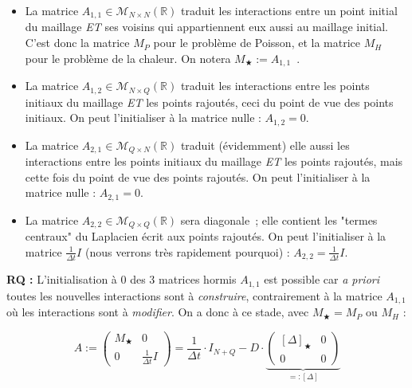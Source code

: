 \documentclass[12pt]{article}
\def \RR {\mathbb{R}}
\def \sM {\mathcal{M}}
\def \disp {\displaystyle}
\begin{document}
\noindent
\begin{itemize}
	\item La matrice $A_{1,1} \in \sM_{N \times N} (\RR)$ traduit les interactions entre un point initial du maillage \textit{ET} ses voisins qui appartiennent eux aussi au maillage initial. C'est donc la matrice $M_P$ pour le problème de Poisson, et la matrice $M_H$ pour le problème de la chaleur. On notera $M_\bigstar := A_{1,1}$~.

\vspace{5 mm}

	\item La matrice $A_{1,2} \in \sM_{N \times Q} (\RR)$ traduit les interactions entre les points initiaux du maillage \textit{ET} les points rajoutés, ceci du point de vue des points initiaux. On peut l'initialiser à la matrice nulle : $A_{1,2} = 0$.

\vspace{5 mm}

	\item La matrice $A_{2,1} \in \sM_{Q \times N} (\RR)$ traduit (évidemment) elle aussi les interactions entre les points initiaux du maillage \textit{ET} les points rajoutés, mais cette fois du point de vue des points rajoutés. On peut l'initialiser à la matrice nulle : $A_{2,1} = 0$.

\vspace{5 mm}

	\item La matrice $A_{2,2} \in \sM_{Q \times Q} (\RR)$ sera diagonale~; elle contient les "termes centraux" du Laplacien écrit aux points rajoutés. On peut l'initialiser à la matrice $\frac{1}{\Delta t} I$ (nous verrons très rapidement pourquoi) : $A_{2,2} = \frac{1}{\Delta t} I$.
\end{itemize}

\vspace{5 mm}

\noindent
\textbf{RQ :} L'initialisation à 0 des 3 matrices hormis $A_{1,1}$ est possible car \textit{a priori} toutes les nouvelles interactions sont à \textit{construire}, contrairement à la matrice $A_{1,1}$ où les interactions sont à \textit{modifier}. On a donc à ce stade, avec $M_\bigstar = M_P$ ou $M_H$ :

$$A := \left( \begin{array}{c|c}
M_\bigstar & 0 \\
\hline
0 & \frac{1}{\Delta t} I
\end{array} \right) = \frac{1}{\Delta t} \cdot I_{N+Q} - D \cdot \underbrace{ \left( \begin{array}{c|c}
[\Delta]_\bigstar & 0 \\
\hline
0 & 0
\end{array} \right) }_{\disp =: [\Delta]}
$$
\end{document}
